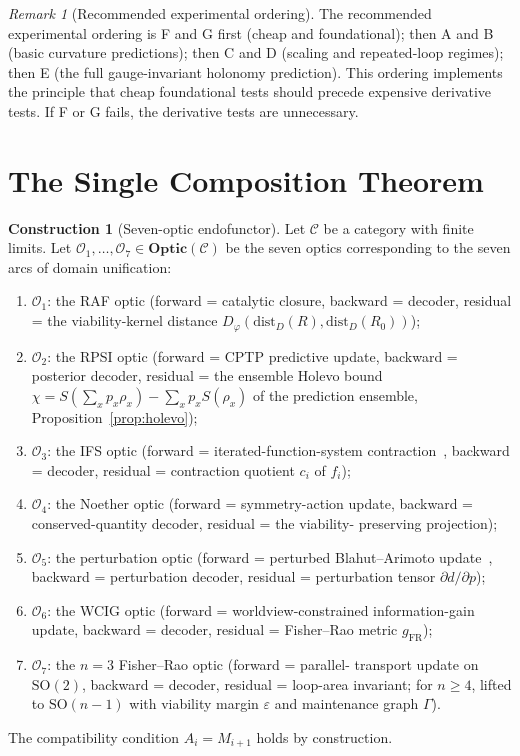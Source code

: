 \documentclass[11pt,a4paper]{article}
\theoremstyle{plain}
\theoremstyle{definition}
\newtheorem{construction}[theorem]{Construction}
\theoremstyle{remark}
\newtheorem{remark}[theorem]{Remark}
\newcommand{\OO}{\mathcal{O}}
\newcommand{\CC}{\mathcal{C}}
\newcommand{\SO}{\mathrm{SO}}
\newcommand{\Optic}{\mathbf{Optic}}
\begin{document}
\begin{remark}[Recommended experimental ordering]
\label{rem:ordering}
The recommended experimental ordering is F and G first (cheap and
foundational); then A and B (basic curvature predictions); then C and
D (scaling and repeated-loop regimes); then E (the full gauge-invariant
holonomy prediction). This ordering implements the principle that cheap
foundational tests should precede expensive derivative tests. If F or G
fails, the derivative tests are unnecessary.
\end{remark}


\section{The Single Composition Theorem}\label{sec:composition}

\begin{construction}[Seven-optic endofunctor]
\label{con:seven}
Let $\CC$ be a category with finite limits. Let $\OO_1,\ldots,\OO_7\in
\Optic(\CC)$ be the seven optics corresponding to the seven arcs of
domain unification:
\begin{enumerate}[leftmargin=*,itemsep=1pt]
\item $\OO_1$: the RAF optic (forward = catalytic closure, backward =
decoder, residual = the viability-kernel distance
$D_\varphi(\mathrm{dist}_D(R),\mathrm{dist}_D(R_0))$);
\item $\OO_2$: the RPSI optic (forward = CPTP predictive update,
backward = posterior decoder, residual = the ensemble Holevo bound
$\chi = S(\sum_x p_x \rho_x) - \sum_x p_x S(\rho_x)$ of the
prediction ensemble, Proposition~\ref{prop:holevo});
\item $\OO_3$: the IFS optic (forward = iterated-function-system
contraction~\cite{hutchinson1981,barnsley1988}, backward = decoder,
residual = contraction quotient $c_i$ of $f_i$);
\item $\OO_4$: the Noether optic (forward = symmetry-action update,
backward = conserved-quantity decoder, residual = the viability-
preserving projection);
\item $\OO_5$: the perturbation optic (forward = perturbed
Blahut--Arimoto update~\cite{blahut1972,arimoto1972}, backward =
perturbation decoder, residual = perturbation tensor
$\partial d/\partial p$);
\item $\OO_6$: the WCIG optic (forward = worldview-constrained
information-gain update, backward = decoder, residual = Fisher--Rao
metric $g_{\mathrm{FR}}$);
\item $\OO_7$: the $n=3$ Fisher--Rao optic (forward = parallel-
transport update on $\SO(2)$, backward = decoder, residual = loop-area
invariant; for $n\geq 4$, lifted to $\SO(n-1)$ with viability margin
$\varepsilon$ and maintenance graph $\Gamma$).
\end{enumerate}
The compatibility condition $A_i = M_{i+1}$ holds by construction.
\end{construction}
\end{document}
